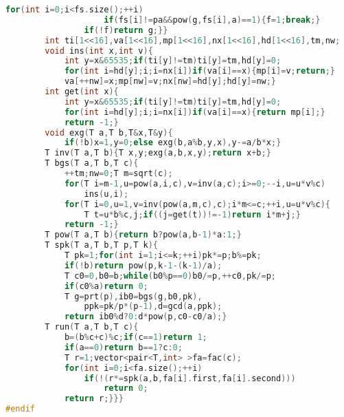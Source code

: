 \documentclass{book}
\begin{document}
\begin{lstlisting}[language=C++,title={Nth Root Modulo M.hpp (4098 bytes, 97 lines)}]
                for(int i=0;i<fs.size();++i)
                    if(fs[i]!=pa&&pow(g,fs[i],a)==1){f=1;break;}
                if(!f)return g;}}
        int ti[1<<16],va[1<<16],mp[1<<16],nx[1<<16],hd[1<<16],tm,nw;
        void ins(int x,int v){
            int y=x&65535;if(ti[y]!=tm)ti[y]=tm,hd[y]=0;
            for(int i=hd[y];i;i=nx[i])if(va[i]==x){mp[i]=v;return;}
            va[++nw]=x;mp[nw]=v;nx[nw]=hd[y];hd[y]=nw;}
        int get(int x){
            int y=x&65535;if(ti[y]!=tm)ti[y]=tm,hd[y]=0;
            for(int i=hd[y];i;i=nx[i])if(va[i]==x){return mp[i];}
            return -1;}
        void exg(T a,T b,T&x,T&y){
            if(!b)x=1,y=0;else exg(b,a%b,y,x),y-=a/b*x;}
        T inv(T a,T b){T x,y;exg(a,b,x,y);return x+b;}
        T bgs(T a,T b,T c){
            ++tm;nw=0;T m=sqrt(c);
            for(T i=m-1,u=pow(a,i,c),v=inv(a,c);i>=0;--i,u=u*v%c)
                ins(u,i);
            for(T i=0,u=1,v=inv(pow(a,m,c),c);i*m<=c;++i,u=u*v%c){
                T t=u*b%c,j;if((j=get(t))!=-1)return i*m+j;}
            return -1;}
        T pow(T a,T b){return b?pow(a,b-1)*a:1;}
        T spk(T a,T b,T p,T k){
            T pk=1;for(int i=1;i<=k;++i)pk*=p;b%=pk;
            if(!b)return pow(p,k-1-(k-1)/a);
            T c0=0,b0=b;while(b0%p==0)b0/=p,++c0,pk/=p;
            if(c0%a)return 0;
            T g=prt(p),ib0=bgs(g,b0,pk),
                ppk=pk/p*(p-1),d=gcd(a,ppk);
            return ib0%d?0:d*pow(p,c0-c0/a);}
        T run(T a,T b,T c){
            b=(b%c+c)%c;if(c==1)return 1;
            if(a==0)return b==1?c:0;
            T r=1;vector<pair<T,int> >fa=fac(c);
            for(int i=0;i<fa.size();++i)
                if(!(r*=spk(a,b,fa[i].first,fa[i].second)))
                    return 0;
            return r;}}}
#endif\end{lstlisting}
\end{document}
